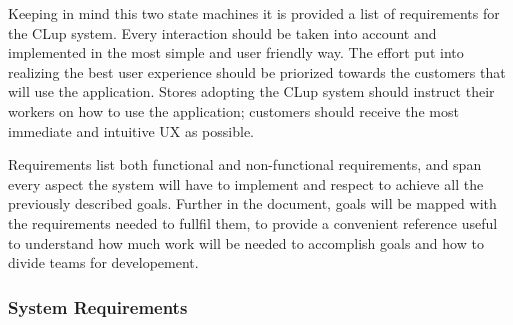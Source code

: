 Keeping in mind this two state machines it is provided a list of requirements for the CLup system.
Every interaction should be taken into account and implemented in the most simple and user friendly way.
The effort put into realizing the best user experience should be priorized towards the customers that will use the application. Stores adopting the CLup system should instruct their workers on how to use the application; customers should receive the most immediate and intuitive UX as possible.

Requirements list both functional and non-functional requirements, and span every aspect the system will have to implement and respect to achieve all the previously described goals. Further in the document, goals will be mapped with the requirements needed to fullfil them, to provide a convenient reference useful to understand how much work will be needed to accomplish goals and how to divide teams for developement.

\vfill
\pagebreak

\subsubsection{System Requirements}

